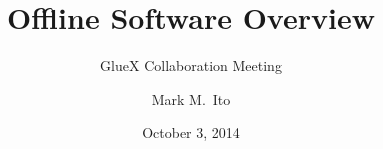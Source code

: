 \documentclass[xcolor=dvipsnames,hyperref={pdfpagelabels=false}]{beamer}
\title{Offline Software Overview}
\subtitle{GlueX Collaboration Meeting}
\author[Mark Ito]{Mark M.\ Ito}
\date{October 3, 2014}
\institute[JLab]{Jefferson Lab}
\newcommand{\f}{\frame}
\begin{document}
\f{\titlepage}
\end{document}

